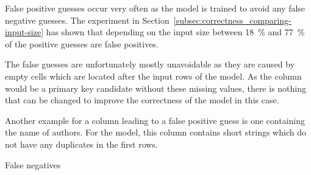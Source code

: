 False positive guesses occur very often as the model is trained to avoid any false negative guesses. The experiment in Section~\ref{subsec:correctness_comparing-input-size} has shown that depending on the input size between \SI{18}{\percent} and \SI{77}{\percent} of the positive guesses are false positives. %

The false guesses are unfortunately mostly unavoidable as they are caused by empty cells which are located after the input rows of the model. As the column would be a primary key candidate without these missing values, there is nothing that can be changed to improve the correctness of the model in this case.

Another example for a column leading to a false positive guess is one containing the name of authors. For the model, this column contains short strings which do not have any duplicates in the first rows. %

False negatives


